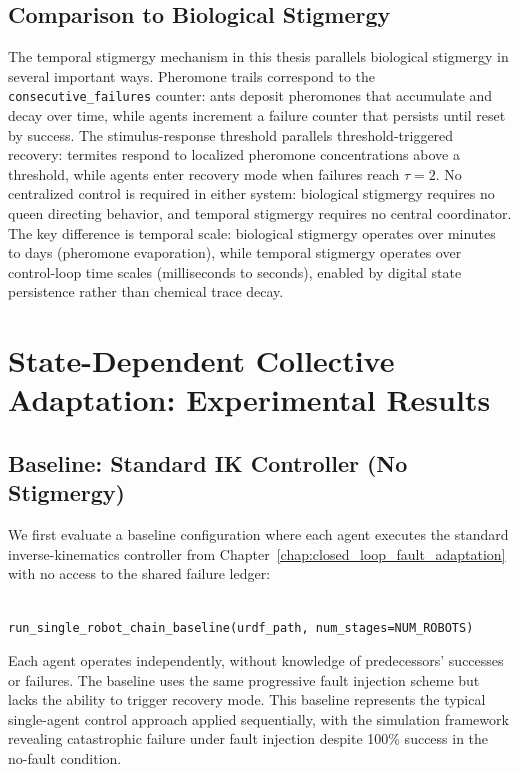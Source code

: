 \documentclass[12pt,a4paper,oneside]{report}
\begin{document}
\subsection{Comparison to Biological Stigmergy}
\label{subsec:comparison_to_biological_stigmergy}

The temporal stigmergy mechanism in this thesis parallels biological stigmergy in several important ways. Pheromone trails correspond to the \texttt{consecutive\_failures} counter: ants deposit pheromones that accumulate and decay over time, while agents increment a failure counter that persists until reset by success. The stimulus-response threshold parallels threshold-triggered recovery: termites respond to localized pheromone concentrations above a threshold, while agents enter recovery mode when failures reach $\tau = 2$. No centralized control is required in either system: biological stigmergy requires no queen directing behavior, and temporal stigmergy requires no central coordinator. The key difference is temporal scale: biological stigmergy operates over minutes to days (pheromone evaporation), while temporal stigmergy operates over control-loop time scales (milliseconds to seconds), enabled by digital state persistence rather than chemical trace decay.
\section{State-Dependent Collective Adaptation: Experimental Results}
\subsection{Baseline: Standard IK Controller (No Stigmergy)}
\label{subsec:baseline_standard_ik_controller_no_stigmergy}

We first evaluate a baseline configuration where each agent executes the standard inverse-kinematics controller from Chapter~\ref{chap:closed_loop_fault_adaptation} with no access to the shared failure ledger:
{\small

\begin{verbatim}

run_single_robot_chain_baseline(urdf_path, num_stages=NUM_ROBOTS)
\end{verbatim}
}

Each agent operates independently, without knowledge of predecessors' successes or failures. The baseline uses the same progressive fault injection scheme but lacks the ability to trigger recovery mode. This baseline represents the typical single-agent control approach applied sequentially, with the simulation framework revealing catastrophic failure under fault injection despite 100\% success in the no-fault condition.
\end{document}
